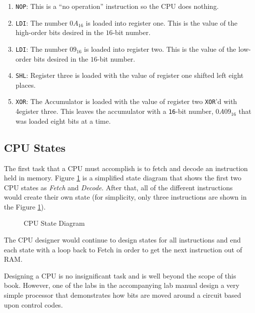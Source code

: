 \begin{enumerate}
  \item \lstinline[columns=fixed]|NOP|: This is a ``no operation'' instruction so the \ac{CPU} does nothing.
  \item \lstinline[columns=fixed]|LDI|: The number $ 0A_{16} $ is loaded into register one. This is the value of the high-order bits desired in the $ 16 $-bit number.
  \item \lstinline[columns=fixed]|LDI|: The number $ 09_{16} $ is loaded into register two.  This is the value of the low-order bits desired in the $ 16 $-bit number.
  \item \lstinline[columns=fixed]|SHL|: Register three is loaded with the value of register one shifted left eight places.
  \item \lstinline[columns=fixed]|XOR|: The Accumulator is loaded with the value of register two \lstinline[columns=fixed]|XOR|'d with 4egister three. This leaves the accumulator with a \lstinline[columns=fixed]|16|-bit number, $ 0A09_{16} $ that was loaded eight bits at a time.
\end{enumerate}

\subsection{CPU States}
\label{SIM:subsec:cpu_states}

The first task that a \ac{CPU} must accomplish is to fetch and decode an instruction held in memory. Figure \ref{SIM:fig:cpu_state_diagram} is a simplified state diagram that shows the first two \ac{CPU} states as \emph{Fetch} and \emph{Decode}. After that, all of the different instructions would create their own state (for simplicity, only three instructions are shown in the Figure \ref{SIM:fig:cpu_state_diagram}).

\begin{figure}[H]
  \caption{CPU State Diagram}
  \label{SIM:fig:cpu_state_diagram}
  \myfloatalign
\end{figure}

The \ac{CPU} designer would continue to design states for all instructions and end each state with a loop back to Fetch in order to get the next instruction out of \ac{RAM}.

Designing a \ac{CPU} is no insignificant task and is well beyond the scope of this book. However, one of the labs in the accompanying lab manual design a very simple processor that demonstrates how bits are moved around a circuit based upon control codes.